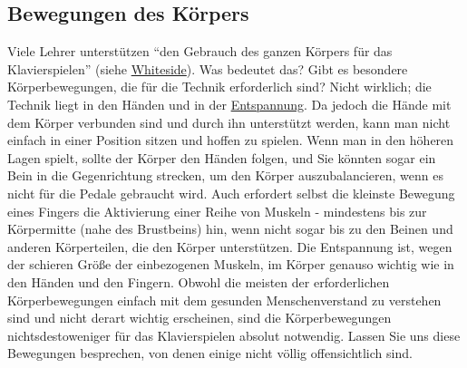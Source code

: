 
\subsection{Bewegungen des Körpers}
\label{c1iii4c}

Viele Lehrer unterstützen \enquote{den Gebrauch des ganzen Körpers für das Klavierspielen} (siehe \hyperref[Whiteside]{Whiteside}).
Was bedeutet das?
Gibt es besondere Körperbewegungen, die für die Technik erforderlich sind?
Nicht wirklich; die Technik liegt in den Händen und in der \hyperref[c1ii14]{Entspannung}.
Da jedoch die Hände mit dem Körper verbunden sind und durch ihn unterstützt werden, kann man nicht einfach in einer Position sitzen und hoffen zu spielen.
Wenn man in den höheren Lagen spielt, sollte der Körper den Händen folgen, und Sie könnten sogar ein Bein in die Gegenrichtung strecken, um den Körper auszubalancieren, wenn es nicht für die Pedale gebraucht wird.
Auch erfordert selbst die kleinste Bewegung eines Fingers die Aktivierung einer Reihe von Muskeln - mindestens bis zur Körpermitte (nahe des Brustbeins) hin, wenn nicht sogar bis zu den Beinen und anderen Körperteilen, die den Körper unterstützen.
Die Entspannung ist, wegen der schieren Größe der einbezogenen Muskeln, im Körper genauso wichtig wie in den Händen und den Fingern.
Obwohl die meisten der erforderlichen Körperbewegungen einfach mit dem gesunden Menschenverstand zu verstehen sind und nicht derart wichtig erscheinen, sind die Körperbewegungen nichtsdestoweniger für das Klavierspielen absolut notwendig.
Lassen Sie uns diese Bewegungen besprechen, von denen einige nicht völlig offensichtlich sind.

